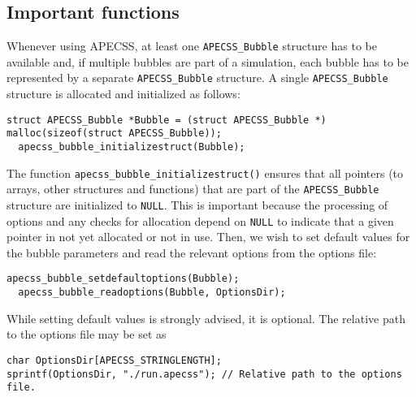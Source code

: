 \subsection{Important functions}

Whenever using APECSS, at least one {\tt APECSS\_Bubble} structure has to be available and, if multiple bubbles are part of a simulation, each bubble has to be represented by a separate {\tt APECSS\_Bubble} structure. A single {\tt APECSS\_Bubble} structure is allocated and initialized as follows:
\begin{lstlisting}[style=CStyle,numbers=none]
  struct APECSS_Bubble *Bubble = (struct APECSS_Bubble *) malloc(sizeof(struct APECSS_Bubble));
  apecss_bubble_initializestruct(Bubble);
\end{lstlisting}\vspace{-0.75em}
The function {\tt apecss\_bubble\_initializestruct()} ensures that all pointers (to arrays, other structures and functions) that are part of the {\tt APECSS\_Bubble} structure are initialized to {\tt NULL}. This is important because the processing of options and any checks for allocation depend on {\tt NULL} to indicate that a given pointer in not yet allocated or not in use.
Then, we wish to set default values for the bubble parameters and read the relevant options from the options file:
\begin{lstlisting}[style=CStyle,numbers=none]
  apecss_bubble_setdefaultoptions(Bubble);
  apecss_bubble_readoptions(Bubble, OptionsDir);
\end{lstlisting}\vspace{-0.75em}
While setting default values is strongly advised, it is optional. The relative path to the options file may be set as
\begin{lstlisting}[style=CStyle,numbers=none]
char OptionsDir[APECSS_STRINGLENGTH];
sprintf(OptionsDir, "./run.apecss"); // Relative path to the options file.
\end{lstlisting}

